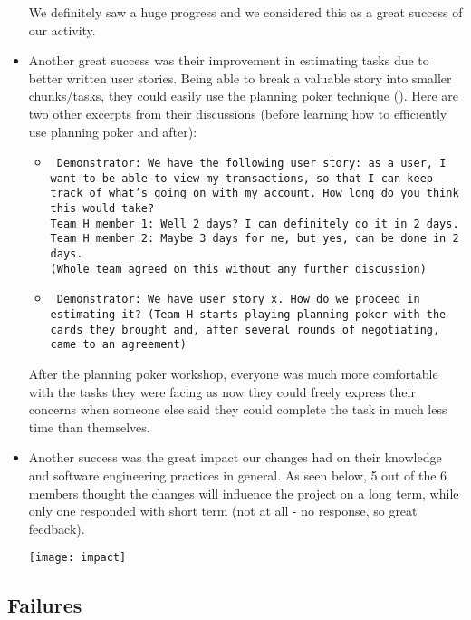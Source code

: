 \documentclass[11pt]{article}
\begin{document}
\begin{itemize}
We definitely saw a huge progress and we considered this as a great success of our activity.

\item Another great success was their improvement in estimating tasks due to better written user stories. Being able to break a valuable story into smaller chunks/tasks, they could easily use the planning poker technique (\citet{agile-estimating}). Here are two other excerpts from their discussions (before learning how to efficiently use planning poker and after):

\begin{itemize}
\item 
\texttt{
Demonstrator: We have the following user story: as a user, I want to be able to view my transactions, so that I can keep track of what's going on with my account. How long do you think this would take? \\
Team H member 1: Well 2 days? I can definitely do it in 2 days.\\
Team H member 2: Maybe 3 days for me, but yes, can be done in 2 days.\\
(Whole team agreed on this without any further discussion)
}
\item
\texttt{
Demonstrator: We have user story x. How do we proceed in estimating it?
(Team H starts playing planning poker with the cards they brought and, after several rounds of negotiating, came to an agreement)
}
\end{itemize}

After the planning poker workshop, everyone was much more comfortable with the tasks they were facing as now they could freely express their concerns when someone else said they could complete the task in much less time than themselves.

\item Another success was the great impact our changes had on their knowledge and software engineering practices in general. As seen below, 5 out of the 6 members thought the changes will influence the project on a long term, while only one responded with short term (not at all - no response, so great feedback).

\texttt{[image: impact]}

\end{itemize}

\subsection*{Failures}
\end{document}
